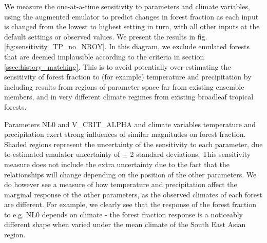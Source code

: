 \documentclass[gmd, manuscript]{copernicus}
\begin{document}
We measure the one-at-a-time sensitivity to parameters and climate variables, using the augmented emulator to predict changes in forest fraction as each input is changed from the lowest to highest setting in turn, with all other inputs at the default settings or observed values. We present the results in fig. \ref{fig:sensitivity_TP_no_NROY}. In this diagram, we exclude emulated forests that are deemed implausible according to the criteria in section \ref{ssec:history_matching}. This is to avoid potentially over-estimating the sensitivity of forest fraction to (for example) temperature and precipitation by including results from regions of parameter space far from existing ensemble members, and in very different climate regimes from existing broadleaf tropical forests. 

 Parameters NL0 and V\_CRIT\_ALPHA and climate variables temperature and precipitation exert strong influences of similar magnitudes on forest fraction. Shaded regions represent the uncertainty of the sensitivity to each parameter, due to estimated emulator uncertainty of $\pm$ 2 standard deviations. This sensitivity measure does not include the extra uncertainty due to the fact that the relationships will change depending on the position of the other parameters. We do however see a measure of how temperature and precipitation affect the marginal response of the other parameters, as the observed climates of each forest are different. For example, we clearly see that the response of the forest fraction to e.g. NL0 depends on climate - the forest fraction response is a noticeably different shape when varied under the mean climate of the South East Asian region.
\end{document}
